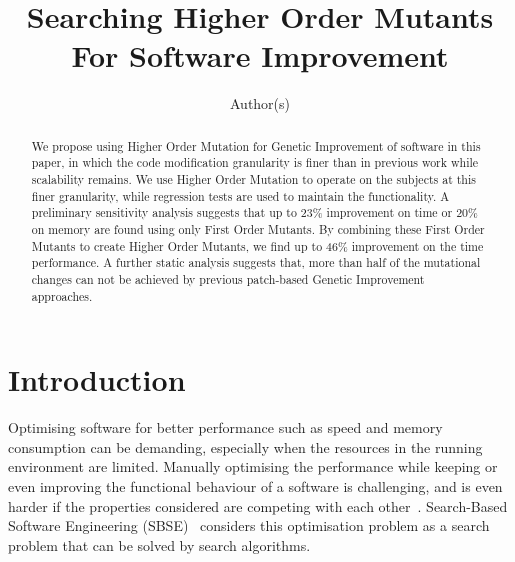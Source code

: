 \documentclass[oribibl]{llncs}
\begin{document}
\title{Searching Higher Order Mutants For Software Improvement}

\author{Author(s)
}



\maketitle

\begin{abstract}
We propose using Higher Order Mutation for Genetic Improvement of software in this paper, in which the code modification granularity is finer than in previous work while scalability remains.
We use Higher Order Mutation to operate on the subjects at this finer granularity, while regression tests are used to maintain the functionality.
A preliminary sensitivity analysis suggests that up to 23\% improvement on time or 20\% on memory are found using only First Order Mutants.
By combining these First Order Mutants to create Higher Order Mutants, we find up to 46\% improvement on the time performance.
A further static analysis suggests that, more than half of the mutational changes can not be achieved by previous patch-based Genetic Improvement approaches.
\end{abstract}

\section{Introduction}
\label{sec_intro}

Optimising software for better performance such as speed and memory consumption can be demanding, especially when the resources in the running environment are limited.
Manually optimising the performance while keeping or even improving the functional behaviour of a software is challenging, 
and is even harder if the properties considered are competing with each other~\cite{Harman:2012:GCC:2351676.2351678}.
Search-Based Software Engineering (SBSE)~\cite{Harman2001833} considers this optimisation problem as a search problem that can be solved by search algorithms.
\end{document}

